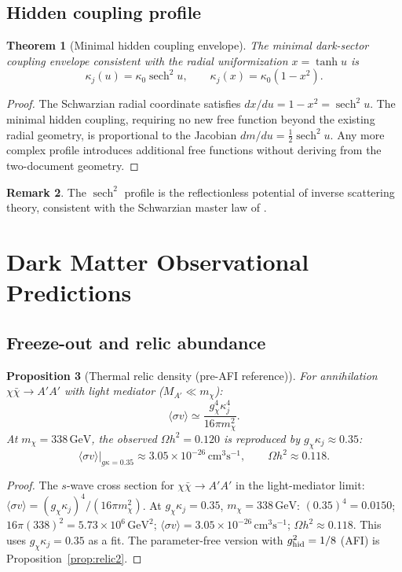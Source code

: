 \documentclass[12pt]{article}
\theoremstyle{plain}
\newtheorem{theorem}{Theorem}[section]
\newtheorem{proposition}[theorem]{Proposition}
\theoremstyle{definition}
\newtheorem{remark}[theorem]{Remark}
\numberwithin{equation}{section}
\DeclareMathOperator{\sech}{sech}
\begin{document}
\subsection{Hidden coupling profile}

\begin{theorem}[Minimal hidden coupling envelope]\label{thm:kappaj}
The minimal dark-sector coupling envelope consistent with the radial
uniformization $x=\tanh u$ is
\[
\kappa_j(u) = \kappa_0\sech^2 u,\qquad
\kappa_j(x) = \kappa_0(1-x^2).
\]
\end{theorem}

\begin{proof}
The Schwarzian radial coordinate satisfies $dx/du = 1-x^2 = \sech^2 u$.
The minimal hidden coupling, requiring no new free function beyond the
existing radial geometry, is proportional to the Jacobian $dm/du=\tfrac12\sech^2 u$.
Any more complex profile introduces additional free functions without
deriving from the two-document geometry.
\end{proof}

\begin{remark}
The $\sech^2$ profile is the reflectionless potential of inverse scattering
theory, consistent with the Schwarzian master law of \cite{YMmassGap}.
\end{remark}

\section{Dark Matter Observational Predictions}\label{sec:DMobs}

\subsection{Freeze-out and relic abundance}

\begin{proposition}[Thermal relic density (pre-AFI reference)]\label{prop:relic}
For annihilation $\chi\bar\chi\to A'A'$ with light mediator ($M_{A'}\ll m_\chi$):
\[
\langle\sigma v\rangle \simeq \frac{g_\chi^4\kappa_j^4}{16\pi m_\chi^2}.
\]
At $m_\chi=338\,\mathrm{GeV}$, the observed $\Omega h^2=0.120$ is reproduced by $g_\chi\kappa_j\approx0.35$:
\[
\langle\sigma v\rangle\big|_{g\kappa=0.35}\approx3.05\times10^{-26}\,\mathrm{cm}^3\mathrm{s}^{-1},
\qquad \Omega h^2 \approx 0.118.
\]
\end{proposition}

\begin{proof}
The $s$-wave cross section for $\chi\bar\chi\to A'A'$ in the light-mediator limit:
$\langle\sigma v\rangle=(g_\chi\kappa_j)^4/(16\pi m_\chi^2)$.
At $g_\chi\kappa_j=0.35$, $m_\chi=338\,\mathrm{GeV}$: $(0.35)^4=0.0150$;
$16\pi(338)^2=5.73\times10^6\,\mathrm{GeV}^2$; $\langle\sigma v\rangle=3.05\times10^{-26}\,\mathrm{cm}^3\mathrm{s}^{-1}$;
$\Omega h^2\approx0.118$.  This uses $g_\chi\kappa_j=0.35$ as a fit.
The parameter-free version with $g_{\rm hid}^2=1/8$ (AFI) is Proposition~\ref{prop:relic2}.
\end{proof}
\end{document}
